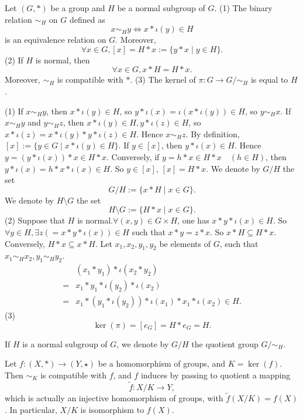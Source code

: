 \begin{propositionenv}
    Let $(G, *)$ be a group and $H$ be a normal subgroup of $G$.
    \newline
    (1) The binary relation $\sim_H$ on $G$ defined as 
    $$x\sim_H y\Leftrightarrow x*\iota(y)\in H$$
    is an equivalence relation on $G$. Moreover,  
    $$\forall x\in G,  [x]=H*x:=\{y*x\mid y\in H\}.$$
    (2) If $H$ is normal,  then
    $$\forall x\in G, x*H=H*x.$$
    Moreover,  $\sim_H$ is compatible with $*$.
    \newline
    (3) The kernel of $\pi :G\rightarrow G/\sim_H$ is equal to $H$.
\end{propositionenv}
\begin{proofenv}
    \quad\newline
    (1) If $x\sim_H y$,  then $x*\iota(y)\in H$,  so $y*\iota(x)=\iota(x*\iota(y))\in H$,  so $y\sim_H x$. If $x\sim_H y$ and $y\sim_H z$,  then $x*\iota(y)\in H,  y*\iota(z)\in H$,  so $x*\iota(z)=x*\iota(y)*y*\iota(z)\in H$. Hence $x\sim_H z$. By definition,  $[x]:=\{y\in G\mid  x*\iota(y)\in H\}$. If $y\in [x]$,  then $y*\iota(x)\in H$. Hence $y=(y*\iota(x))*x\in H*x$. Conversely,  if $y=h*x\in H*x \quad (h\in H)$,  then $y*\iota(x)=h*x*\iota(x)\in H$. So $y\in [x]$,  $[x]=H*x$.
    \newline
    We denote by $G/H $ the set 
    $$G/H:=\{x*H\mid x\in G\}.$$ 
    We denote by $H\setminus G$ the set 
    $$H\setminus G:=\{H*x\mid x\in G\}.$$
    (2) Suppose that $H$ is normal.$\forall (x, y)\in G\times H$,  one has $x*y*\iota(x)\in H$. So $\forall y\in H, \exists z(=x*y*\iota(x))\in H$ such that $x*y=z*x$. So $x*H\subseteq H*x$. Conversely,  $H*x\subseteq x*H$. Let $x_1, x_2, y_1, y_2$ be elements of $G$,  such that $x_1\sim_H x_2, y_1\sim_H y_2$.
    \begin{align*}
&(x_1*y_1)*\iota (x_2*y_2)\\
=&x_1*y_1*\iota (y_2)*\iota (x_2)\\
=&x_1*(y_1*\iota (y_2))*\iota (x_1)*x_1*\iota (x_2)\in H.
\end{align*}
    (3)$$\ker(\pi)=[e_G]=H*e_G=H.$$
\end{proofenv}
\begin{notationenv}
    If $H$ is a normal subgroup of $G$,  we denote by $G/H$ the quotient group $G/\sim_H$.
\end{notationenv}
\begin{theoremenv}
    Let $f:(X, *)\rightarrow (Y, \star)$ be a homomorphism of groups,  and $K=\ker(f)$. Then $\sim_K$ is compatible with $f$,  and $f$ induces by passing to quotient a mapping
    $$\tilde{f}:X/K\longrightarrow Y, $$
    which is actually an injective homomorphism of groups,  with $\tilde{f}(X/K)=f(X)$. In particular,  $X/K$ is isomorphism to $f(X)$.
        \begin{center}
\end{center}
\end{theoremenv}
